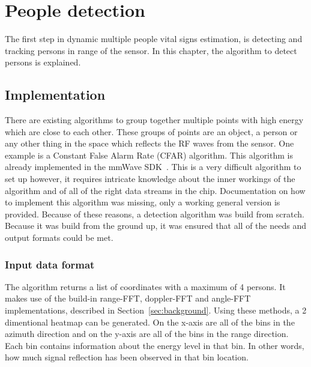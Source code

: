 \chapter{People detection}
\label{chp:people_detection}

The first step in dynamic multiple people vital signs estimation, is detecting and tracking persons in range of the sensor. In this chapter, the algorithm to detect persons is explained.

\section{Implementation}
There are existing algorithms to group together multiple points with high energy which are close to each other. These groups of points are an object, a person or any other thing in the space which reflects the RF waves from the sensor. One example is a Constant False Alarm Rate (CFAR) algorithm. This algorithm is already implemented in the mmWave SDK~\cite{mmwavesdk_website}. This is a very difficult algorithm to set up however, it requires intricate knowledge about the inner workings of the algorithm and of all of the right data streams in the chip. Documentation on how to implement this algorithm was missing, only a working general version is provided. Because of these reasons, a detection algorithm was build from scratch. Because it was build from the ground up, it was ensured that all of the needs and output formats could be met.

\subsection{Input data format}
The algorithm returns a list of coordinates with a maximum of 4 persons. It makes use of the build-in range-FFT, doppler-FFT and angle-FFT implementations, described in Section~\ref{sec:background}. Using these methods, a 2 dimentional heatmap can be generated. On the x-axis are all of the bins in the azimuth direction and on the y-axis are all of the bins in the range direction. Each bin contains information about the energy level in that bin. In other words, how much signal reflection has been observed in that bin location. 


